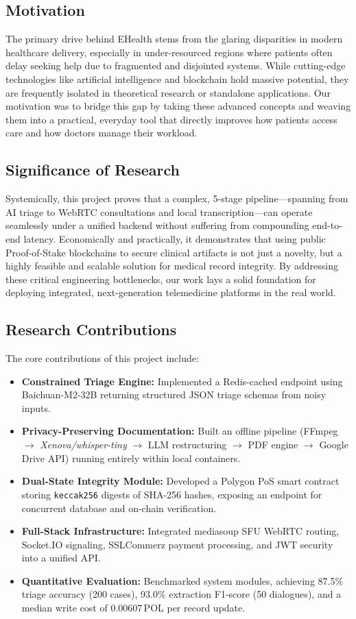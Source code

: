 \subsection{Motivation}
The primary drive behind EHealth stems from the glaring disparities in modern healthcare delivery, especially in under-resourced regions where patients often delay seeking help due to fragmented and disjointed systems. While cutting-edge technologies like artificial intelligence and blockchain hold massive potential, they are frequently isolated in theoretical research or standalone applications. Our motivation was to bridge this gap by taking these advanced concepts and weaving them into a practical, everyday tool that directly improves how patients access care and how doctors manage their workload.

\subsection{Significance of Research}
Systemically, this project proves that a complex, 5-stage pipeline—spanning from AI triage to WebRTC consultations and local transcription—can operate seamlessly under a unified backend without suffering from compounding end-to-end latency. Economically and practically, it demonstrates that using public Proof-of-Stake blockchains to secure clinical artifacts is not just a novelty, but a highly feasible and scalable solution for medical record integrity. By addressing these critical engineering bottlenecks, our work lays a solid foundation for deploying integrated, next-generation telemedicine platforms in the real world.

\subsection{Research Contributions}
The core contributions of this project include:
\begin{itemize}
    \setlength{\itemsep}{1pt}
    \setlength{\parskip}{0pt}
    \item \textbf{Constrained Triage Engine:} Implemented a Redis-cached endpoint using Baichuan-M2-32B returning structured JSON triage schemas from noisy inputs.
    \item \textbf{Privacy-Preserving Documentation:} Built an offline pipeline (FFmpeg $\rightarrow$ \textit{Xenova/whisper-tiny} $\rightarrow$ LLM restructuring $\rightarrow$ PDF engine $\rightarrow$ Google Drive API) running entirely within local containers.
    \item \textbf{Dual-State Integrity Module:} Developed a Polygon PoS smart contract storing \texttt{keccak256} digests of SHA-256 hashes, exposing an endpoint for concurrent database and on-chain verification.
    \item \textbf{Full-Stack Infrastructure:} Integrated mediasoup SFU WebRTC routing, Socket.IO signaling, SSLCommerz payment processing, and JWT security into a unified API.
    \item \textbf{Quantitative Evaluation:} Benchmarked system modules, achieving 87.5\% triage accuracy (200 cases), 93.0\% extraction F1-score (50 dialogues), and a median write cost of 0.00607\,POL per record update.
\end{itemize}

